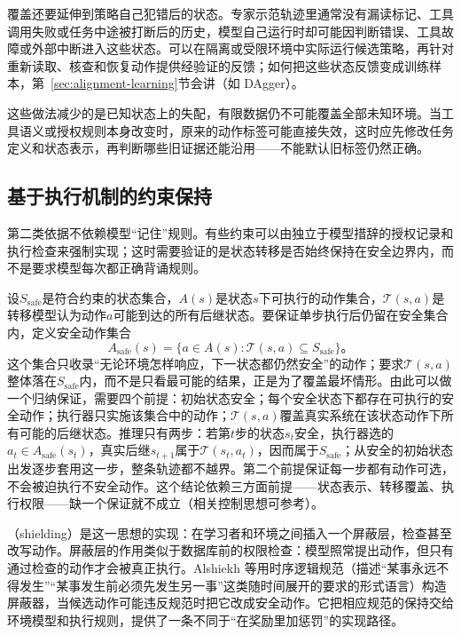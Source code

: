 覆盖还要延伸到策略自己犯错后的状态。专家示范轨迹里通常没有漏读标记、工具调用失败或任务中途被打断后的历史，模型自己运行时却可能因判断错误、工具故障或外部中断进入这些状态。可以在隔离或受限环境中实际运行候选策略，再针对重新读取、核查和恢复动作提供经验证的反馈；如何把这些状态反馈变成训练样本，第~\ref{sec:alignment-learning}节会讲（如 DAgger）。

这些做法减少的是已知状态上的失配，有限数据仍不可能覆盖全部未知环境。当工具语义或授权规则本身改变时，原来的动作标签可能直接失效，这时应先修改任务定义和状态表示，再判断哪些旧证据还能沿用——不能默认旧标签仍然正确。

\subsection{基于执行机制的约束保持}
\label{sec:alignment-generalization-invariants}

第二类依据不依赖模型“记住”规则。有些约束可以由独立于模型措辞的授权记录和执行检查来强制实现；这时需要验证的是状态转移是否始终保持在安全边界内，而不是要求模型每次都正确背诵规则。

设$S_{\mathrm{safe}}$是符合约束的状态集合，$A(s)$是状态$s$下可执行的动作集合，$\mathcal T(s,a)$是转移模型认为动作$a$可能到达的所有后继状态。要保证单步执行后仍留在安全集合内，定义安全动作集合
\begin{equation}
 A_{\mathrm{safe}}(s)
 =\{a\in A(s):\mathcal T(s,a)\subseteq S_{\mathrm{safe}}\}\text{。}
 \label{eq:alignment-safe-actions}
\end{equation}
这个集合只收录“无论环境怎样响应，下一状态都仍然安全”的动作；要求$\mathcal T(s,a)$整体落在$S_{\mathrm{safe}}$内，而不是只看最可能的结果，正是为了覆盖最坏情形。由此可以做一个归纳保证，需要四个前提：初始状态安全；每个安全状态下都存在可执行的安全动作；执行器只实施该集合中的动作；$\mathcal T(s,a)$覆盖真实系统在该状态动作下所有可能的后继状态。推理只有两步：若第$t$步的状态$s_t$安全，执行器选的$a_t\in A_{\mathrm{safe}}(s_t)$，真实后继$s_{t+1}$属于$\mathcal T(s_t,a_t)$，因而属于$S_{\mathrm{safe}}$；从安全的初始状态出发逐步套用这一步，整条轨迹都不越界。第二个前提保证每一步都有动作可选，不会被迫执行不安全动作。这个结论依赖三方面前提——状态表示、转移覆盖、执行权限——缺一个保证就不成立（相关控制思想可参考）。

（shielding）是这一思想的实现：在学习者和环境之间插入一个屏蔽层，检查甚至改写动作。屏蔽层的作用类似于数据库前的权限检查：模型照常提出动作，但只有通过检查的动作才会被真正执行。Alshiekh 等用时序逻辑规范（描述“某事永远不得发生”“某事发生前必须先发生另一事”这类随时间展开的要求的形式语言）构造屏蔽器，当候选动作可能违反规范时把它改成安全动作。它把相应规范的保持交给环境模型和执行规则，提供了一条不同于“在奖励里加惩罚”的实现路径。

